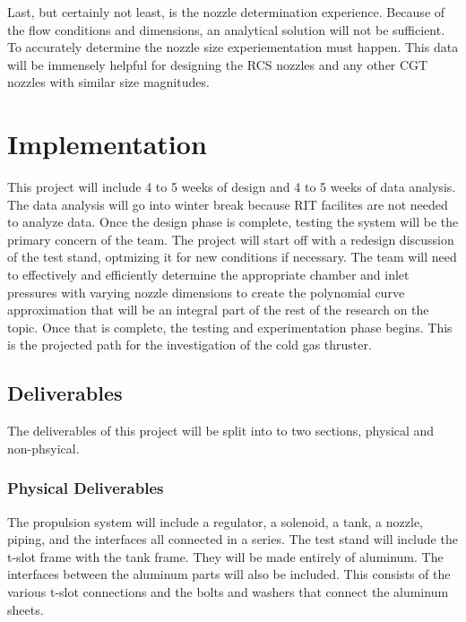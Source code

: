 \documentclass[conference]{IEEEtran} %
\begin{document}
Last, but certainly not least, is the nozzle determination experience. Because of the flow conditions and dimensions, an analytical solution will not be sufficient. To accurately determine
the nozzle size experiementation must happen. This data will be immensely helpful for designing the RCS nozzles and any other CGT nozzles with similar
size magnitudes.


\section{Implementation}
\label{sec:implementation}

This project will include 4 to 5 weeks of design and 4 to 5 weeks of data analysis. The data analysis will go into winter break because RIT facilites are not needed to analyze data. Once the design phase
is complete, testing the system will be the primary concern of the team. The project will start off with a redesign discussion of the test stand, optmizing it for new conditions if necessary.
The team will need to effectively and efficiently determine the appropriate chamber and inlet pressures with varying
nozzle dimensions to create the polynomial curve approximation that will be an integral part of the rest of the research on the topic. Once that is complete, the
testing and experimentation phase begins. This is the projected path for the investigation of the cold gas thruster.
\subsection{Deliverables}
\label{subsec:deliverables}
The deliverables of this project will be split into to two sections, physical and non-phsyical.

\subsubsection{Physical Deliverables}
\label{subsubsec: physical deliverables}

The propulsion system will include a regulator,
a solenoid, a tank, a nozzle, piping, and the interfaces all connected in a series. The test stand will include the t-slot frame with the tank frame. They will be made entirely of aluminum. The interfaces between the aluminum parts will also be included. This
consists of the various t-slot connections and the bolts and washers that connect the aluminum sheets.
\end{document}
